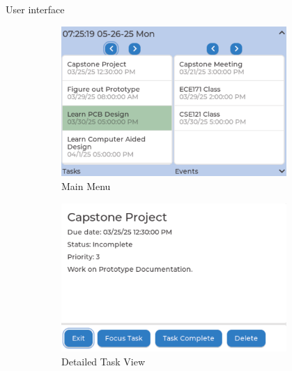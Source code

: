 \documentclass[final, cmyk]{beamer}
\newlength{\sepwidth}
\newlength{\colwidth}
\newlength{\bigcolwidth}
\newcommand{\separatorcolumn}{\begin{column}{\sepwidth}\end{column}}
\begin{document}
\begin{frame}[t]
  \begin{columns}
    \separatorcolumn
    \begin{column}{\bigcolwidth}
      \begin{block}{User interface}
        \begin{figure}
          \centering
          \begin{subfigure}{0.24\textwidth}
            \includegraphics[width=\textwidth]{taskEvent_CMYK.pdf}
            \caption{Main Menu}
          \end{subfigure}
          \hfill
          \begin{subfigure}{0.24\textwidth}
            \includegraphics[width=\textwidth]{taskTile_CMYK.pdf}
            \caption{Detailed Task View}
          \end{subfigure}
          \hfill
          \begin{subfigure}{0.24\textwidth}

\end{subfigure}
\end{figure}
\end{block}
\end{column}
\end{columns}
\end{frame}
\end{document}

